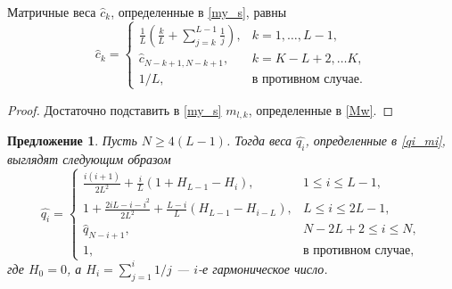 \documentclass[12pt,a4paper,fleqn,leqno]{article}
\newtheorem{proposition}{Предложение}%
\begin{document}
\begin{lemma} \label{myweightstat}
Матричные веса $\hat c_k$, определенные в \eqref{my_s}, равны
\begin{equation*}
\hat c_k = \begin{cases}
\frac{1}{L}\left(\frac{k}{L} + \sum_{j=k}^{L-1} \frac{1}{j} \right),& k = 1, \ldots, L-1, \\
\hat c_{N - k + 1, N - k + 1}, & k = K - L + 2, \ldots K, \\
1/L, &\text{в противном случае}.
\end{cases}
\end{equation*}
\end{lemma}

\begin{proof}
Достаточно подставить в \eqref{my_s} $m_{l,k}$, определенные в \eqref{Mw}.
\end{proof}

\begin{proposition} \label{myserweightstat}
Пусть $N \ge 4(L-1)$. Тогда веса $\hat{q_i}$, определенные в \eqref{qi_mi},
выглядят следующим образом
\begin{equation*}
\hat{q_i} = \begin{cases}
\frac{i(i+1)}{2 L^2} + \frac{i}{L}(1 + H_{L-1} - H_i), &1 \le i \le L-1, \\
1 + \frac{2iL-i-i^2}{2L^2} + \frac{L-i}{L}(H_{L-1} - H_{i - L}), & L \le i \le 2L-1, \\
\hat{q}_{N-i+1}, &N-2L+2 \le i \le N, \\
1, &\text{в противном случае},
\end{cases}
\end{equation*}
где $H_0 = 0$, а $H_i = \sum_{j=1}^i 1/j$ --- $i$-е гармоническое число.
\end{proposition}
\end{document}
